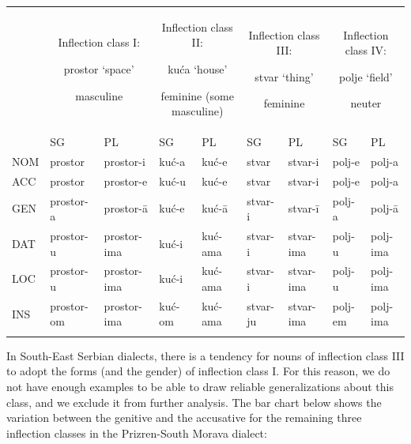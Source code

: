 \documentclass[output=paper]{langscibook}
\begin{document}
\begin{tabularx}{\textwidth}{XXXXXXXXX}
 & \multicolumn{2}{c}{{ Inflection class I:}
\lsptoprule

{ prostor ‘space’}

 masculine} & \multicolumn{2}{c}{{ Inflection class II:}

{ kuća ‘house’}

 feminine (some masculine)} & \multicolumn{2}{c}{{ Inflection class III:}

{ stvar ‘thing’}

 feminine} & \multicolumn{2}{c}{{ Inflection class IV:}

{ polje ‘field’}

 neuter}\\
& SG & PL & SG & PL & SG & PL & SG & PL\\
NOM & prostor & prostor-i & kuć-a & kuć-e & stvar & stvar-i & polj-e & polj-a\\
ACC & prostor & prostor-e & kuć-u & kuć-e & stvar & stvar-i & polj-e & polj-a\\
GEN & prostor-a & prostor-ā & kuć-e & kuć-ā & stvar-i & stvar-ī & polj-a & polj-ā\\
DAT & prostor-u & prostor-ima & kuć-i & kuć-ama & stvar-i & stvar-ima & polj-u & polj-ima\\
LOC & prostor-u & prostor-ima & kuć-i & kuć-ama & stvar-i & stvar-ima & polj-u & polj-ima\\
INS & prostor-om & prostor-ima & kuć-om & kuć-ama & stvar-ju & stvar-ima & polj-em & polj-ima\\
\lspbottomrule
\end{tabularx}
\begin{table}
\caption{Inflection classes in Serbian.}
\label{tab:key:3}
\end{table}

In South-East Serbian dialects, there is a tendency for nouns of inflection class III to adopt the forms (and the gender) of inflection class I. For this reason, we do not have enough examples to be able to draw reliable generalizations about this class, and we exclude it from further analysis.  The bar chart below shows the variation between the genitive and the accusative for the remaining three inflection classes in the Prizren-South Morava dialect:

  
 
\end{document}
